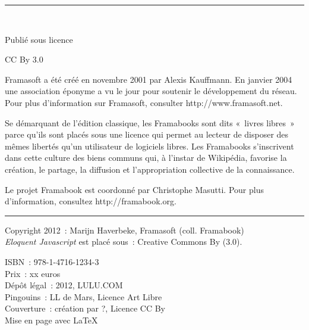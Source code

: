 \documentclass{FramateX}
\begin{document}
\begin{titlepage}
\begin{center}
\end{center}
\begin{center}
\noindent\rule{\linewidth/2}{1pt} \\
\end{center}
\begin{center}Publié sous licence\end{center}
\begin{center}CC By 3.0\end{center}
\newpage 
\begin{flushleft}Framasoft a été créé en novembre 2001 par Alexis Kauffmann. En janvier 2004 une association éponyme a vu le jour pour soutenir le développement du réseau. Pour plus d’information sur Framasoft, consulter http://www.framasoft.net.\end{flushleft}
\begin{flushleft}Se démarquant de l’édition classique, les Framabooks sont dits «~livres libres~» parce qu’ils sont placés sous une licence qui permet au lecteur de disposer des mêmes libertés qu’un utilisateur de logiciels libres. Les Framabooks s’inscrivent dans cette culture des biens communs qui, à l’instar de Wikipédia, favorise la création, le partage, la diffusion et l’appropriation collective de la connaissance.\end{flushleft}
\begin{flushleft}Le projet Framabook est coordonné par Christophe Masutti. Pour plus d’information, consultez http://framabook.org.\end{flushleft}
\begin{center}\rule{100mm}{1pt}\end{center}\bigskip{}

\bigskip

\begin{small}
\noindent Copyright 2012~: Marijn Haverbeke, Framasoft (coll. Framabook)\\
\textit{Eloquent Javascript} est placé sous~: Creative Commons By (3.0).

\noindent ISBN~: 978-1-4716-1234-3 \\
Prix~: xx euros \\
Dépôt légal~: 2012, LULU.COM \\
Pingouins~: LL de Mars, Licence Art Libre \\
Couverture~: création par ?, Licence CC By \\
Mise en page avec \LaTeX  \\
\end{small}



\end{titlepage}
\end{document}
